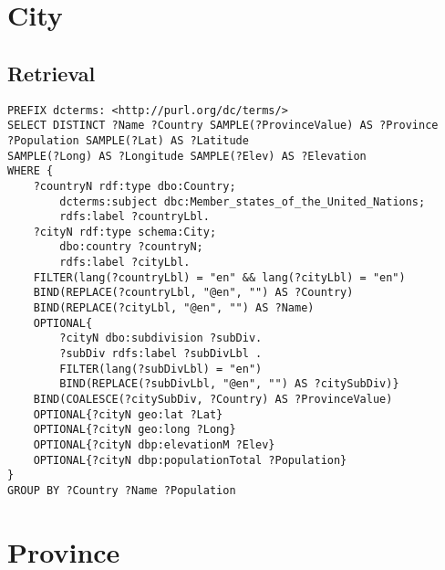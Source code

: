 \documentclass[11pt]{article}
\begin{document}
\section{City}

\subsection{Retrieval}

{\footnotesize\begin{verbatim}
PREFIX dcterms: <http://purl.org/dc/terms/>
SELECT DISTINCT ?Name ?Country SAMPLE(?ProvinceValue) AS ?Province
?Population SAMPLE(?Lat) AS ?Latitude
SAMPLE(?Long) AS ?Longitude SAMPLE(?Elev) AS ?Elevation
WHERE {
    ?countryN rdf:type dbo:Country;
        dcterms:subject dbc:Member_states_of_the_United_Nations;
        rdfs:label ?countryLbl.
    ?cityN rdf:type schema:City;
        dbo:country ?countryN;
        rdfs:label ?cityLbl.
    FILTER(lang(?countryLbl) = "en" && lang(?cityLbl) = "en")
    BIND(REPLACE(?countryLbl, "@en", "") AS ?Country)
    BIND(REPLACE(?cityLbl, "@en", "") AS ?Name)
    OPTIONAL{ 
        ?cityN dbo:subdivision ?subDiv.
        ?subDiv rdfs:label ?subDivLbl .
        FILTER(lang(?subDivLbl) = "en")
        BIND(REPLACE(?subDivLbl, "@en", "") AS ?citySubDiv)}
    BIND(COALESCE(?citySubDiv, ?Country) AS ?ProvinceValue)
    OPTIONAL{?cityN geo:lat ?Lat}
    OPTIONAL{?cityN geo:long ?Long}
    OPTIONAL{?cityN dbp:elevationM ?Elev}
    OPTIONAL{?cityN dbp:populationTotal ?Population}
}
GROUP BY ?Country ?Name ?Population
\end{verbatim}}

\section{Province}
\end{document}
